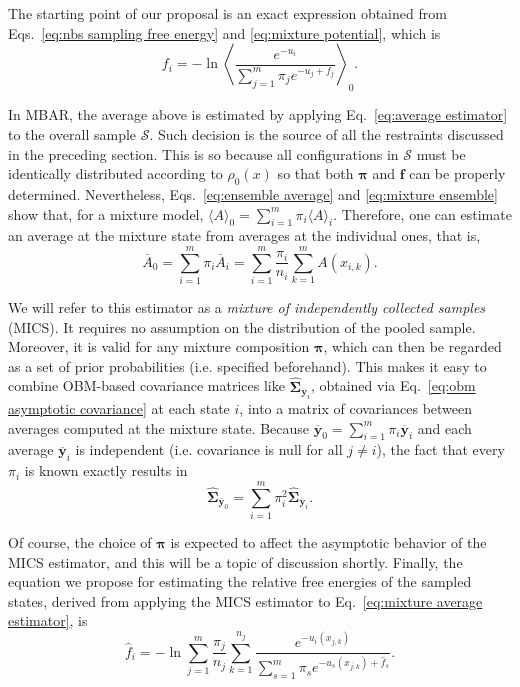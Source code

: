 \documentclass[journal=jctcce,manuscript=article,layout=twocolumn]{achemso}
\newcommand{\mt}[1]{\boldsymbol{\mathbf{#1}}}   %
\newcommand{\vt}[1]{\boldsymbol{\mathbf{#1}}}   %
\begin{document}
The starting point of our proposal is an exact expression obtained from Eqs.~\eqref{eq:nbs sampling free energy} and \eqref{eq:mixture potential}, which is
\begin{equation}
\label{eq:free energy exact}
f_i = -\ln \left\langle \frac{e^{-u_i}}{\sum_{j=1}^m \pi_j e^{-u_j + f_j}} \right\rangle_0.
\end{equation}

In MBAR, the average above is estimated by applying Eq.~\eqref{eq:average estimator} to the overall sample $\mathcal S$. Such decision is the source of all the restraints discussed in the preceding section. This is so because all configurations in $\mathcal S$ must be identically distributed according to $\rho_0(x)$ so that both $\vt \pi$ and $\vt f$ can be properly determined. Nevertheless, Eqs.~\eqref{eq:ensemble average} and \eqref{eq:mixture ensemble} show that, for a mixture model, $\langle A \rangle_0 = \sum_{i=1}^m \pi_i \langle A \rangle_i$. Therefore, one can estimate an average at the mixture state from averages at the individual ones, that is,
\begin{equation}
\label{eq:mixture average estimator}
{\overline A}_0 = \sum_{i=1}^m \pi_i \overline{A}_i = \sum_{i=1}^m \frac{\pi_i}{n_i} \sum_{k=1}^m A(x_{i,k}).
\end{equation}

We will refer to this estimator as a \textit{mixture of independently collected samples} (MICS). It requires no assumption on the distribution of the pooled sample. Moreover, it is valid for any mixture composition $\vt \pi$, which can then be regarded as a set of prior probabilities (i.e. specified beforehand). This makes it easy to combine OBM-based covariance matrices like $\hat{\mt \Sigma}_{\overline{\vt y}_i}$, obtained via Eq.~\eqref{eq:obm asymptotic covariance} at each state $i$, into a matrix of covariances between averages computed at the mixture state. Because $\overline{\vt y}_0 = \sum_{i=1}^m \pi_i \overline{\vt y}_i$ and each average $\overline{\vt y}_i$ is independent (i.e. covariance is null for all $j \neq i$), the fact that every $\pi_i$ is known exactly results in
\begin{equation}
\label{eq:mixture variance estimator}
\hat{\mt \Sigma}_{\overline{\vt y}_0} = \sum_{i=1}^m \pi_i^2 \hat{\mt \Sigma}_{\overline{\vt y}_i}.
\end{equation}

Of course, the choice of $\vt \pi$ is expected to affect the asymptotic behavior of the MICS estimator, and this will be a topic of discussion shortly. Finally, the equation we propose for estimating the relative free energies of the sampled states, derived from applying the MICS estimator to Eq.~\eqref{eq:mixture average estimator}, is
\begin{equation}
\label{eq:mblock free energy estimator}
{\hat f}_i = -\ln \sum_{j=1}^m \frac{\pi_j}{n_j} \sum_{k=1}^{n_j} \frac{e^{-u_i(x_{j,k})}}{\sum_{s=1}^m \pi_s e^{-u_s(x_{j,k}) + {\hat f}_s}}.
\end{equation}
\end{document}
